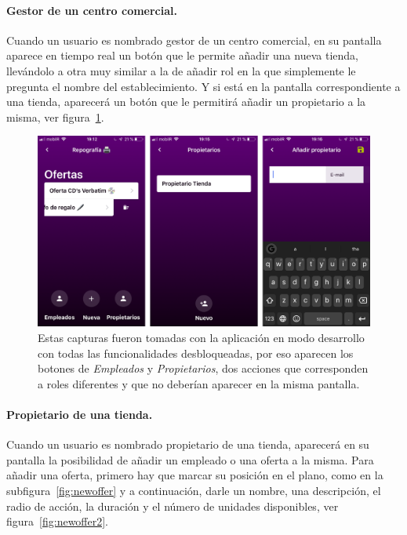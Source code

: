 \paragraph{Gestor de un centro comercial.} Cuando un usuario es nombrado gestor de un centro comercial, en su pantalla aparece en tiempo real un botón que le permite añadir una nueva tienda, llevándolo a otra muy similar a la de añadir rol en la que simplemente le pregunta el nombre del establecimiento. Y si está en la pantalla correspondiente a una tienda, aparecerá un botón que le permitirá añadir un propietario a la misma, ver figura~\ref{addrol}.

\begin{figure}[tbp]
\centering
\includegraphics[scale=0.2]{figures/anadir-rol.png}
\caption{Estas capturas fueron tomadas con la aplicación en modo desarrollo con todas las funcionalidades desbloqueadas, por eso aparecen los botones de \textit{Empleados} y \textit{Propietarios}, dos acciones que corresponden a roles diferentes y que no deberían aparecer en la misma pantalla.\label{addrol}}
\end{figure}

\paragraph{Propietario de una tienda.} Cuando un usuario es nombrado propietario de una tienda, aparecerá en su pantalla la posibilidad de añadir un empleado o una oferta a la misma. Para añadir una oferta, primero hay que marcar su posición en el plano, como en la subfigura~\ref{fig:newoffer} y a continuación, darle un nombre, una descripción, el radio de acción, la duración y el número de unidades disponibles, ver figura~\ref{fig:newoffer2}.

